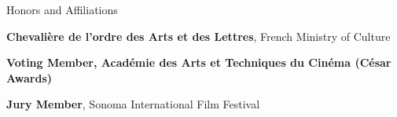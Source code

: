 \begin{rubric}{Honors and Affiliations}

\entry*[2026]%
\textbf{Chevali\`ere de l'ordre des Arts et des Lettres}, French Ministry of Culture

\entry*[2022--present]%
\textbf{Voting Member, Acad\'emie des Arts et Techniques du Cin\'ema (C\'esar Awards)}

\entry*[2016]%
\textbf{Jury Member}, Sonoma International Film Festival

\end{rubric}
